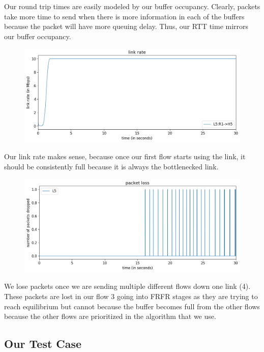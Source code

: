 \documentclass{article}
\begin{document}
Our round trip times are easily modeled by our buffer occupancy. Clearly, packets take more time to send when there is more information in each of the buffers because the packet will have more queuing delay. Thus, our RTT time mirrors our buffer occupancy.

\begin{figure}[H]
\centering
\includegraphics[width = \textwidth]{"test_case5_fast link rate"}
\end{figure}


Our link rate makes sense, because once our first flow starts using the link, it should be consistently full because it is always the bottlenecked link.

\begin{figure}[H]
\centering
\includegraphics[width = \textwidth]{"test_case5_fast packet loss"}
\end{figure}

We lose packets once we are sending multiple different flows down one link (4). These packets are lost in our flow 3 going into FRFR stages as they are trying to reach equilibrium but cannot because the buffer becomes full from the other flows because the other flows are prioritized in the algorithm that we use.


\subsection{Our Test Case}
\end{document}
